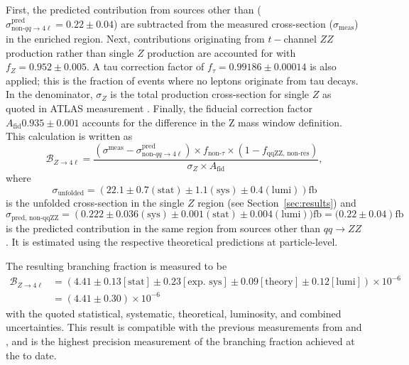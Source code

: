First, the predicted contribution from sources other than \qqFourL{} ($\sigma_{\text{non-}qq\to 4\ell}^{\text{pred}}=0.22\pm0.04$) are subtracted from the measured cross-section ($\sigma_{\text{meas}}$) in the \ZFourL enriched region. Next, contributions originating from $t-$channel $ZZ$ production rather than single $Z$ production are accounted for with $f_{Z}=0.952\pm0.005$. A tau correction factor of $f_{\tau}=0.99186\pm0.00014$ is also applied; this is the fraction of events where no leptons originate from tau decays. In the denominator, $\sigma_Z$ is the total production cross-section for single $Z$ as quoted in ATLAS measurement \cite{missing citation}. Finally, the fiducial correction factor $A_{\text{fid}}0.935 \pm 0.001$ accounts for the difference in the Z mass window definition. This calculation is written as
\begin{equation*}
    \mathcal{B}_{Z\rightarrow 4\ell} = \frac{\left(\sigma^{\text{meas}}-\sigma_{\text{non-}qq\to 4\ell}^{\text{pred}}\right) \times f_{\text{non-}\tau} \times (1-f_{\text{qqZZ, non-res}})}{\sigma_{Z} \times A_{\text{fid}}},
\end{equation*}
where 
\begin{equation*}
    \sigma_{\text{unfolded}} = \left(22.1 \pm 0.7(\text{stat}) \pm 1.1(\text{sys}) \pm 0.4 (\text{lumi})  \right)\text{fb} 
\end{equation*}
is the unfolded cross-section in the single $Z$ region (see Section~\ref{sec:results}) and  
\begin{equation*}
    \sigma_{\text{pred, non-qqZZ}} =  \left(0.222 \pm 0.036(\text{sys}) \pm 0.001 (\text{stat}) \pm 0.004 (\text{lumi}))\text{fb} = (0.22\pm 0.04 \right) \text{fb}
\end{equation*}
is the predicted contribution in the same region from sources other than $qq\to ZZ$. It is estimated using the respective theoretical predictions at particle-level. 

The resulting \ZFourL branching fraction is measured to be
\begin{align*}
    \mathcal{B}_{Z\rightarrow 4\ell} & = \left( 4.41 \pm 0.13 \left[\text{stat}\right] \pm 0.23 \left[\text{exp. sys}\right] \pm 0.09 \left[\text{theory}\right]\pm 0.12 \left[\text{lumi}\right] \right) \times 10^{-6} \\
    & =  \left( 4.41 \pm 0.30 \right) \times 10^{-6}
\end{align*}
with the quoted statistical, systematic, theoretical, luminosity, and combined uncertainties. This result is compatible with the previous measurements from \CMS and \ATLAS, and is the highest precision measurement of the \ZFourL branching fraction achieved at the \LHC to date. 

